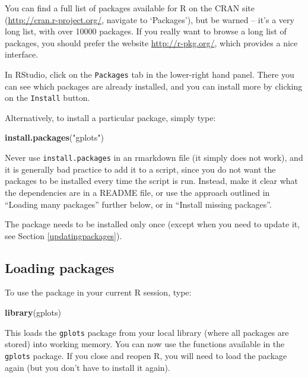 \documentclass[]{book}
\newenvironment{Shaded}{\begin{snugshade}}{\end{snugshade}}
\newcommand{\KeywordTok}[1]{\textcolor[rgb]{0.13,0.29,0.53}{\textbf{#1}}}
\newcommand{\NormalTok}[1]{#1}
\newcommand{\StringTok}[1]{\textcolor[rgb]{0.31,0.60,0.02}{#1}}
\let\BeginKnitrBlock\begin \let\EndKnitrBlock\end
\begin{document}
You can find a full list of packages available for R on the CRAN site (\url{http://cran.r-project.org/}, navigate to `Packages'), but be warned -- it's a very long list, with over 10000 packages. If you really want to browse a long list of packages, you should prefer the website \url{http://r-pkg.org/}, which provides a nice interface.

In RStudio, click on the \texttt{Packages} tab in the lower-right hand panel. There you can see which packages are already installed, and you can install more by clicking on the \texttt{Install} button.

Alternatively, to install a particular package, simply type:

\begin{Shaded}
\begin{Highlighting}[]
\KeywordTok{install.packages}\NormalTok{(}\StringTok{"gplots"}\NormalTok{)}
\end{Highlighting}
\end{Shaded}

\BeginKnitrBlock{rmdcaution}
Never use \texttt{install.packages} in an rmarkdown file (it simply does not work), and it is generally bad practice to add it to a script, since you do not want the packages to be installed every time the script is run. Instead, make it clear what the dependencies are in a README file, or use the approach outlined in ``Loading many packages'' further below, or in ``Install missing packages''.
\EndKnitrBlock{rmdcaution}

The package needs to be installed only once (except when you need to update it, see Section \ref{updatingpackages}).

\hypertarget{loadpackage}{%
\subsection{Loading packages}\label{loadpackage}}

To use the package in your current R session, type:

\begin{Shaded}
\begin{Highlighting}[]
\KeywordTok{library}\NormalTok{(gplots)}
\end{Highlighting}
\end{Shaded}

This loads the \texttt{gplots} package from your local library (where all packages are stored) into working memory. You can now use the functions available in the \texttt{gplots} package. If you close and reopen R, you will need to load the package again (but you don't have to install it again).
\end{document}
